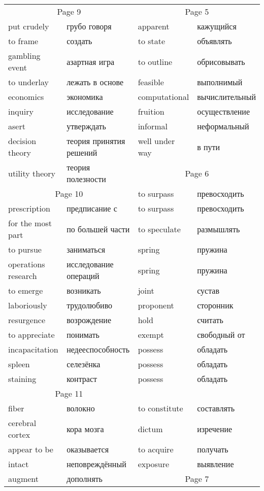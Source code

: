 \documentclass[12pt]{article}
\begin{document}
\begin{tabular}{| l l | l l | }
  \hline
  \multicolumn{2}{c|}{Page 9} & \multicolumn{2}{c|}{Page 5} \\
  put crudely & грубо говоря & apparent & кажущийся\\
  to frame & создать & to state & объявлять \\
  gambling event & азартная игра & to outline & обрисовывать \\
  to underlay & лежать в основе & feasible & выполнимый \\
  economics & экономика & computational & вычислительный \\
  inquiry & исследование & fruition & осуществление \\
  asert & утверждать & informal & неформальный \\
  decision theory & теория принятия решений & well under way & в пути \\ \cline{3-4}
  utility theory & теория полезности & \multicolumn{2}{c|}{Page 6} \\ \cline{1-2}
  \multicolumn{2}{c|}{Page 10} & to surpass & превосходить\\ 
  prescription & предписание с & to surpass & превосходить \\
  for the most part & по большей части & to speculate & размышлять \\
  to pursue & заниматься & spring & пружина \\
  operations research & исследование операций & spring & пружина \\

  to emerge & возникать & joint & сустав \\
  laboriously & трудолюбиво & proponent & сторонник \\
  resurgence & возрождение & hold & считать \\
  to appreciate & понимать & exempt & свободный от \\
  incapacitation & недееспособность & possess & обладать \\ 
  spleen & селезёнка & possess & обладать \\
  staining & контраст & possess & обладать \\ 
  \cline{1-2}

  \multicolumn{2}{c|}{Page 11} \\
  fiber & волокно & to constitute & составлять \\
  cerebral cortex & кора мозга & dictum & изречение \\
  appear to be & оказывается & to acquire & получать \\
  intact & неповреждённый & exposure & выявление \\ \cline{3-4}
  augment & дополнять & \multicolumn{2}{c|}{Page 7} \\ \cline{1-2}


\end{tabular}
\end{document}
